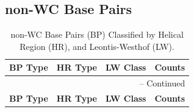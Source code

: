 \subsection{non-WC Base Pairs}


\begin{center}
\begin{longtable}{c|c|c|c}
\caption{non-WC Base Pairs (BP) Classified by Helical Region (HR), and
  Leontis-Westhof (LW).}
\label{tab:noWC_LW}\\ 
\hline 
\bf{BP Type} & \bf{HR Type} & \bf{LW
  Class} & \bf{Counts}\\ \hline \hline
\endfirsthead

\multicolumn{4}{r}{{\tablename} \thetable{} -- Continued} \\
\hline 
\bf{BP Type} & \bf{HR Type} & \bf{LW
  Class} & \bf{Counts}\\ \hline \hline
\endhead


\end{longtable}
\end{center}
